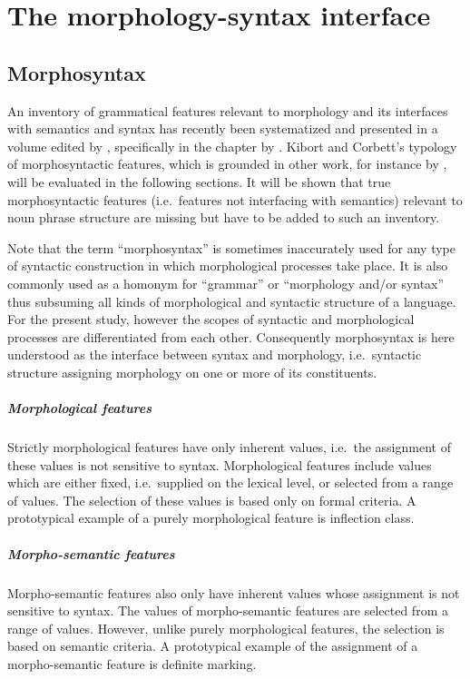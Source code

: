 
\chapter{The morphology-syntax interface} \label{syntax-morphology-interface}

\section{Morphosyntax}
An inventory of grammatical features relevant to morphology and its interfaces with semantics and syntax has recently been systematized and presented in a volume edited by \textcite{kibort-etal2010}, specifically in the chapter by \textcite{kibort2010a}. Kibort and Corbett's typology of morphosyntactic features, which is grounded in other work, for instance by \textcite{aronoff1994,corbett1987,carstairs-mccarthy1999,corbett2006,corbett-etal2006,bickel-etal2007,kibort2008a}, will be evaluated in the following sections. It will be shown that true morphosyntactic features (i.e.~features not interfacing with semantics) relevant to noun phrase structure are missing but have to be added to such an inventory.

Note that the term “morphosyntax” is sometimes inaccurately used for any type of syntactic construction in which morphological processes take place. It is also commonly used as a homonym for “grammar” or “morphology and/or syntax” thus subsuming all kinds of morphological and syntactic structure of a language. For the present study, however the scopes of syntactic and morphological processes are differentiated from each other. Consequently morphosyntax is here understood as the interface between syntax and morphology, i.e.~syntactic structure assigning morphology on one or more of its constituents.
\paragraph{Morphological features} 
Strictly morphological features have only inherent values, i.e.~the assignment of these values is not sensitive to syntax. Morphological features include values which are either fixed, i.e.~supplied on the lexical level, or selected from a range of values. The selection of these values is based only on formal criteria. A prototypical example of a purely morphological feature is inflection class.
\paragraph{Morpho-semantic features} 
Morpho-semantic features also only have inherent values whose assignment is not sensitive to syntax. The values of morpho-semantic features are selected from a range of values. However, unlike purely morphological features, the selection is based on semantic criteria. A prototypical example of the assignment of a morpho-semantic feature is definite marking.
